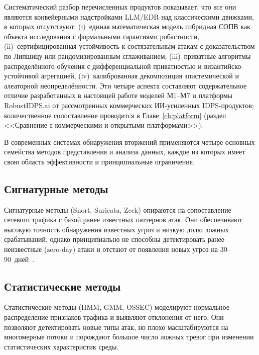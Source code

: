 \noindent Систематический разбор перечисленных продуктов
показывает, что \emph{все} они являются конвейерными надстройками
LLM/EDR над классическими движками, в которых отсутствуют:
(i)~единая математическая модель гибридная СОПВ как объекта
исследования с формальными гарантиями робастности,
(ii)~сертифицированная устойчивость к состязательным атакам с
доказательством по Липшицу или рандомизированным сглаживанием,
(iii)~приватные алгоритмы распределённого обучения с
дифференциальной приватностью и византийско-устойчивой
агрегацией, (iv)~калиброванная декомпозиция эпистемической и
алеаторной неопределённости. Эти четыре аспекта составляют
содержательное отличие разработанных в настоящей работе моделей
М1--М7 и платформы RobustIDPS.ai от рассмотренных коммерческих
ИИ-усиленных IDPS-продуктов; количественное сопоставление
проводится в Главе~\ref{ch:platform} (раздел
<<Сравнение с коммерческими и открытыми платформами>>).

\label{sec:data_representation_methods}

В современных системах обнаружения вторжений применяются четыре основных
семейства методов представления и анализа данных, каждое из которых имеет
свою область эффективности и принципиальные ограничения.

\subsection{Сигнатурные методы}

Сигнатурные методы (Snort, Suricata, Zeek) опираются на сопоставление
сетевого трафика с базой ранее известных паттернов атак. Они обеспечивают
высокую точность обнаружения известных угроз и низкую долю ложных
срабатываний, однако принципиально не способны детектировать ранее
неизвестные (zero-day) атаки и отстают от появления новых угроз на
30--90~дней~\cite{Roesch1999,Paxson1999}.

\subsection{Статистические методы}

Статистические методы (HMM, GMM, OSSEC) моделируют нормальное
распределение признаков трафика и выявляют отклонения от него. Они
позволяют детектировать новые типы атак, но плохо масштабируются на
многомерные потоки и порождают большое число ложных тревог при
изменении статистических характеристик среды.

